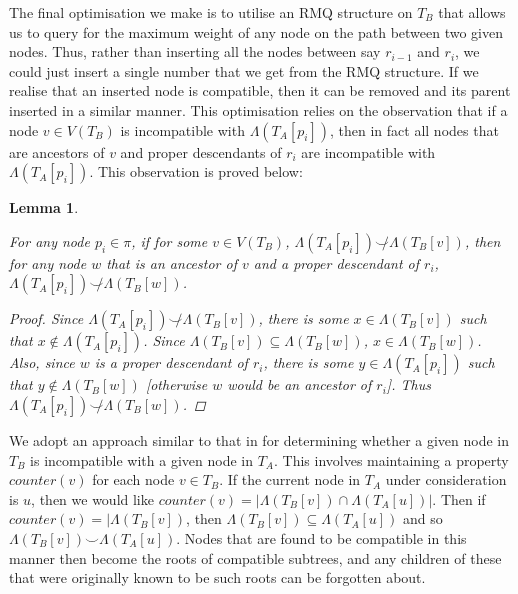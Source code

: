 \documentclass{article}
\newcommand{\compatible}{\smile}
\newcommand{\leafset}{\Lambda}
\newtheorem{filterclustersfindingcompatibletermination}[incompatibility]{Lemma}
\begin{document}
    The final optimisation we make is to utilise an RMQ structure on $T_B$ that allows us to query for the maximum weight of any node on the path between two given nodes. Thus, rather than inserting all the nodes between say $r_{i-1}$ and $r_i$, we could just insert a single number that we get from the RMQ structure. If we realise that an inserted node is compatible, then it can be removed and its parent inserted in a similar manner. This optimisation relies on the observation that if a node $v \in V(T_B)$ is incompatible with $\leafset(T_A[p_i])$, then in fact all nodes that are ancestors of $v$ and proper descendants of $r_i$ are incompatible with $\leafset(T_A[p_i])$. This observation is proved below:

    \begin{filterclustersfindingcompatibletermination}
        \label{lem:filterclustersfindingcompatibletermination}

        For any node $p_i \in \pi$, if for some $v \in V(T_B)$, $\leafset(T_A[p_i]) \not\compatible \leafset(T_B[v])$, then for any node $w$ that is an ancestor of $v$ and a proper descendant of $r_i$, $\leafset(T_A[p_i]) \not\compatible \leafset(T_B[w])$.

        \begin{proof}
            Since $\leafset(T_A[p_i]) \not\compatible \leafset(T_B[v])$, there is some $x \in \leafset(T_B[v])$ such that $x \not\in \leafset(T_A[p_i])$. Since $\leafset(T_B[v]) \subseteq \leafset(T_B[w])$, $x \in \leafset(T_B[w])$. Also, since $w$ is a proper descendant of $r_i$, there is some $y \in \leafset(T_A[p_i])$ such that $y \not\in \leafset(T_B[w])$ [otherwise $w$ would be an ancestor of $r_i$]. Thus $\leafset(T_A[p_i]) \not\compatible \leafset(T_B[w])$.
        \end{proof}
    \end{filterclustersfindingcompatibletermination}

    We adopt an approach similar to that in \cite{jansson2018algorithms} for determining whether a given node in $T_B$ is incompatible with a given node in $T_A$. This involves maintaining a property $counter(v)$ for each node $v \in T_B$. If the current node in $T_A$ under consideration is $u$, then we would like $counter(v) = |\leafset(T_B[v]) \cap \leafset(T_A[u])|$. Then if $counter(v) = |\leafset(T_B[v])$, then $\leafset(T_B[v]) \subseteq \leafset(T_A[u])$ and so $\leafset(T_B[v]) \compatible \leafset(T_A[u])$. Nodes that are found to be compatible in this manner then become the roots of compatible subtrees, and any children of these that were originally known to be such roots can be forgotten about.\\
\end{document}
